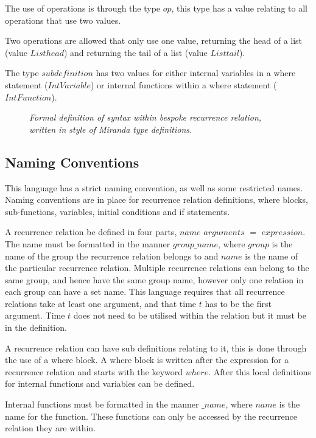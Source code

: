 \documentclass{article}
\begin{document}
The use of operations is through the type $op$, this type has a value relating to all operations that use two values.

Two operations are allowed that only use one value, returning the head of a list (value $Listhead$) and returning the tail of a list (value $Listtail$). 

The type $subdefinition$ has two values for either internal variables in a where statement ($IntVariable$) or internal functions within a where statement ($IntFunction$).  

\begin{figure}[H]
	\centering
	
	\caption{\it Formal definition of syntax within bespoke recurrence relation, written in style of Miranda type definitions.}
	\label{fig:parsetreecode}
\end{figure} 







\subsection{Naming Conventions}
This language has a strict naming convention, as well as some restricted names. Naming conventions are in place for recurrence relation definitions, where blocks, sub-functions, variables, initial conditions and  if statements. 

A recurrence relation be defined in four parts, $name$ $arguments$ $=$ $expression$. The name must be formatted in the manner $group\_name$, where $group$ is the name of the group the recurrence relation belongs to and $name$ is the name of the particular recurrence relation. Multiple recurrence relations can belong to the same group, and hence have the same group name, however only one relation in each group can have a set name. This language requires that all recurrence relations take at least one argument, and that time $t$ has to be the first argument. Time $t$ does not need to be utilised within the relation but it must be in the definition.     

A recurrence relation can have sub definitions relating to it, this is done through the use of a where block. A where block is written after the expression for a recurrence relation and starts with the keyword $where$. After this local definitions for internal functions and variables can be defined. 

Internal functions must be formatted in the manner $\_name$, where $name$ is the name for the function. These functions can only be accessed by the recurrence relation they are within. 
\end{document}
